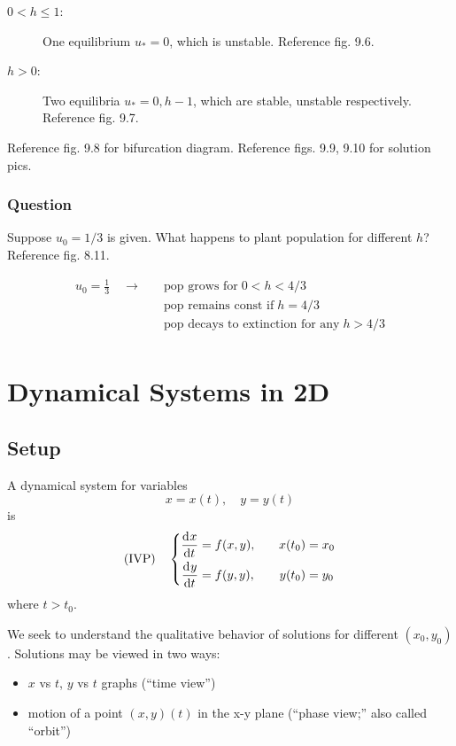 \documentclass[12pt,twoside]{article}
\begin{document}
\begin{description}
\item[$0<h\le1$:] One equilibrium $u_*=0$, which is unstable. Reference fig. 9.6.
\item[$h>0$:] Two equilibria $u_*=0, h-1$, which are stable, unstable
  respectively. Reference fig. 9.7.
\end{description}
Reference fig. 9.8 for bifurcation diagram. Reference figs. 9.9, 9.10 for
solution pics.

\subsubsection*{Question}
Suppose $u_0=1/3$ is given. What happens to plant population for different $h$?
Reference fig. 8.11.

\begin{equation}
  \begin{aligned}
    u_0 = \frac{1}{3} \quad\longrightarrow \quad& \text{pop grows for}\; 0<h<4/3 \\
    & \text{pop remains const if}\; h=4/3 \\
    & \text{pop decays to extinction for any}\; h>4/3 \\
  \end{aligned}
\end{equation}

\section{Dynamical Systems in 2D}
\subsection{Setup}
A dynamical system for variables
$$x=x(t),\quad y=y(t)$$
is
\begin{equation*}
  \text{(IVP)}\quad\left\{
    \begin{aligned}
      \frac{\mathrm{d}^{} {x}}{\mathrm{d}{t}^{}} &= f(x,y),&\quad x(t_0) &= x_0 \\
      \frac{\mathrm{d}^{} {y}}{\mathrm{d}{t}^{}} &= f(y,y),&\quad y(t_0) &= y_0 \\
    \end{aligned}
  \right.
\end{equation*}
where $t>t_0$.

We seek to understand the qualitative behavior of solutions for different $(x_0,
y_0)$. Solutions may be viewed in two ways:
\begin{itemize}
\item $x$ vs $t$, $y$ vs $t$ graphs (``time view'')
\item motion of a point $(x,y)(t)$ in the x-y plane (``phase view;'' also called
  ``orbit'')
\end{itemize}
\end{document}
